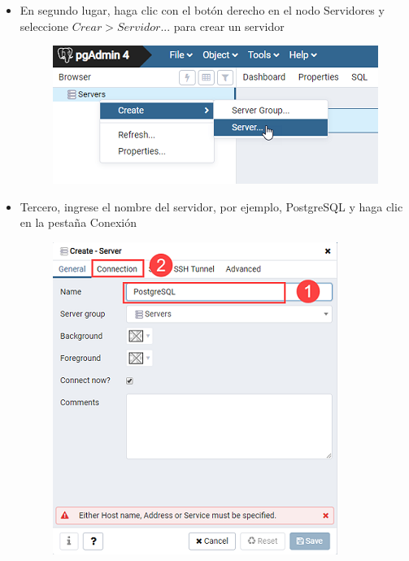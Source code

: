 \documentclass[10pt]{article}
\newcommand{\postgres}[1]{{\textcolor{R}{PostgreSQL} #1}}
\begin{document}
\begin{itemize}
\item En segundo lugar, haga clic con el botón derecho en el nodo Servidores y seleccione $Crear> Servidor ...$ para crear un servidor

\begin{figure}[H]
  \begin{center}
  	 \includegraphics{figures/cap2/img6.png}	 
	 \renewcommand{\arraystretch}{1.3}
  \end{center}
\end{figure}

\item Tercero, ingrese el nombre del servidor, por ejemplo, \postgres{} y haga clic en la pestaña Conexión

\begin{figure}[H]
  \begin{center}
  	 \includegraphics{figures/cap2/img7.png}	 
	 \renewcommand{\arraystretch}{1.3}
  \end{center}
\end{figure}


\end{itemize}
\end{document}
